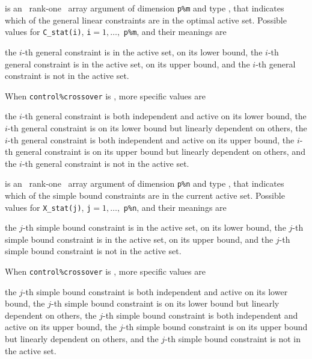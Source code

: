 \documentclass{galahad}
\begin{document}
\begin{description}
 is an \optional\ rank-one \intentout\ array argument of
dimension {\tt p\%m}
and type \integer, that indicates which of the general linear
constraints are in the optimal active set. Possible values for
{\tt C\_stat(i)}, {\tt i}$=1, \ldots ,$ {\tt p\%m}, and their meanings are
\begin{description}
 the $i$-th general constraint
is in the active set, on its lower bound,
 the $i$-th general constraint
is in the active set, on its upper bound, and
  the $i$-th general constraint is not in the active set.
\end{description}
When {\tt control\%crossover} is \true, more specific values are
\begin{description}
 the $i$-th general constraint
is both independent and active on its lower bound,
 the $i$-th general constraint
is on its lower bound but linearly dependent on others,
 the $i$-th general constraint
is both independent and active on its upper bound,
 the $i$-th general constraint
is on its upper bound but linearly dependent on others, and
 the $i$-th general constraint is not in the active set.
\end{description}

 is an \optional\ rank-one \intentout\ array argument of
dimension {\tt p\%n}
and type \integer, that indicates which of the simple bound
constraints are in the current active set. Possible values for
{\tt X\_stat(j)}, {\tt j}$=1, \ldots ,$ {\tt p\%n}, and their meanings are
\begin{description}
 the $j$-th simple bound constraint
is in the active set, on its lower bound,
 the $j$-th simple bound constraint
is in the active set, on its upper bound, and
  the $j$-th simple bound constraint is not in the active set.
\end{description}
When {\tt control\%crossover} is \true, more specific values are
\begin{description}
 the $j$-th simple bound constraint
is both independent and active on its lower bound,
 the $j$-th simple bound constraint
is on its lower bound but linearly dependent on others,
 the $j$-th simple bound constraint
is both independent and active on its upper bound,
 the $j$-th simple bound constraint
is on its upper bound but linearly dependent on others, and
 the $j$-th simple bound constraint is not in the active set.
\end{description}

\end{description}
\end{document}
